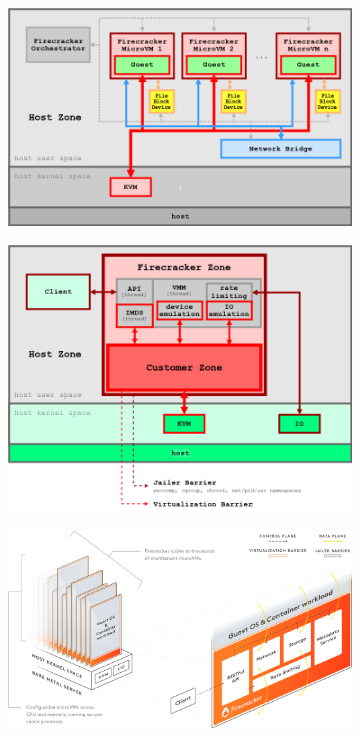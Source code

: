 \documentclass[11pt]{article}
\begin{document}
\begin{figure}[H]
	\begin{subfigure}[a]{0.49\linewidth}
		\includegraphics[width=\linewidth,height=0.27\textheight]{figs/firecracker_host_integration}
		\caption{}
		\label{figs:host}
	\end{subfigure}
	\begin{subfigure}[a]{0.49\linewidth}
		\includegraphics[width=\linewidth]{figs/firecracker_threat_containment}
		\caption{}
		\label{figs:internal}
	\end{subfigure}
	\begin{subfigure}[b]{\linewidth}
		\centering
		\includegraphics[width=0.8\linewidth]{figs/firecracker}
		\caption{}
		\label{figs:fire}
	\end{subfigure}
	\caption{}
	\label{figs:Firecracker}
\end{figure}
\end{document}
